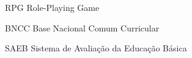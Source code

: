 \begin{siglas}
  \item[RPG] Role-Playing Game
  \item[BNCC] Base Nacional Comum Curricular
  \item[SAEB] Sistema de Avaliação da Educação Básica
\end{siglas}